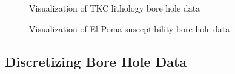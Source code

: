  \begin{figure} [h]
    \centering
    \caption{Visualization of TKC lithology bore hole data}
    \label{fig:TKCBHvis}
\end{figure}

 \begin{figure} [h]
    \centering
    \caption{Visualization of El Poma susceptibility bore hole data}
    \label{fig:EPBHvis}
\end{figure}

\subsection{Discretizing Bore Hole Data}
\label{subsec:discBH}

